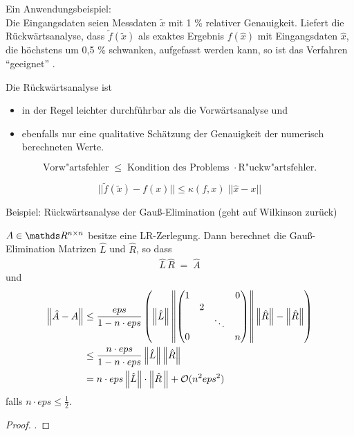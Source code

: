 Ein Anwendungsbeispiel:\\
Die Eingangsdaten seien Messdaten $\tilde{x}$  mit 1 \% relativer Genauigkeit. 
Liefert die Rückwärtsanalyse, dass $\tilde{f} (\tilde{x})$ als exaktes Ergebnis 
$f(\hat x)$ mit Eingangsdaten $\hat x$, 
die höchstens um 0,5 \% schwanken, aufgefasst werden kann,
so ist das Verfahren \enquote{geeignet} . 

Die Rückwärtsanalyse ist
\begin{itemize}
\item in der Regel leichter durchführbar als die
  Vorwärtsanalyse  und 
\item ebenfalls nur eine qualitative Schätzung der
  Genauigkeit der numerisch berechneten Werte.
\end{itemize}

\begin{Beme}
  $$ \mbox{Vorw"artsfehler} \; \leq \; \mbox{Kondition des
    Problems } \cdot \mbox{R"uckw"artsfehler} .$$
  
  $$ ||\tilde f (\tilde x)  - f(x)|| \leq \kappa (f,x) \; || \hat x -x|| $$
  
  Beispiel: Rückwärtsanalyse der Gauß-Elimination
  (geht auf Wilkinson zurück)
\end{Beme}


\begin{Satze}
  $A \in \R^{n\times n}$ besitze eine LR-Zerlegung. Dann berechnet die
  Gauß-Elimination Matrizen $\hat{L}$ und $\hat{R}$,
  so dass
  \begin{gather*}\hat{L}\,\hat{R}\; = \;\hat{A}\end{gather*}
  und
  \begin{align*}
    \left\| \hat{ A}-A \right\| & \leq 
    \frac{eps}{1-n \cdot eps}
      \left( \left\| \hat{L} \right\|
      \left\| \begin{pmatrix}
               1 && & 0\\
               &2\\
               &&\ddots \\
                0&&& n\\
       \end{pmatrix} \right\|\left\| \hat{R} \right\|-\left\| \hat{R} \right\|
       \right)\\
      & \leq  \frac{n\cdot eps}{1-n\cdot eps}\left\| \hat{L} \right\|\left\| \hat{R} \right\| \\
      & = n\cdot eps \left\| \hat{L} \right\|\cdot \left\| \hat{R}\, \right\| +
                                 \mathcal{O}( n^2 eps^2)
  \end{align*}
  falls $n\cdot eps \leq \frac{1}{2}$.
\end{Satze}
\begin{proof}
  \cite[siehe][]{stoerbulirsch}.
\end{proof}


